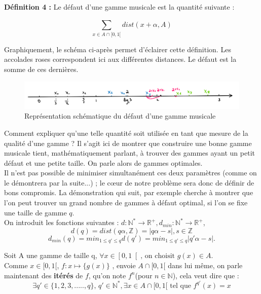\documentclass[moyen]{classeUPD}
\newenvironment{definition}{
	\begin{lrbox}{\tempbox}
		\begin{minipage}{\textwidth}
		}{
		\end{minipage}
	\end{lrbox}
	\begin{center}
		\fcolorbox[HTML]{222222}{EEEEEE}{
			\usebox{\tempbox}
		}
	\end{center}
}
\newcommand{\emf}[1]{\textbf{#1}}
\begin{document}
\begin{definition}
\emf{Définition 4 :} Le défaut d'une gamme musicale est la quantité suivante :

\begin{equation*}
\sum_{x\in A \cap [0,1[}^{} dist(x+\alpha,A)
\end{equation*}

\end{definition}

Graphiquement, le schéma ci-après permet d'éclairer cette définition. Les accolades roses correspondent ici aux différentes distances. Le défaut est la somme de ces dernières.
 
\begin{figure}[h!]
	\begin{center}
		\includegraphics[width=0.7\textheight]{picture1}
		\caption[Défaut d'une gamme musicale]{Représentation schématique du défaut d'une gamme musicale}
		\label{figure 4}
	\end{center}
\end{figure}

Comment expliquer qu’une telle quantité soit utilisée en tant que mesure de la qualité d’une gamme ? Il s’agit ici de montrer que construire une bonne gamme musicale tient, mathématiquement parlant, à trouver des gammes ayant un petit défaut et une petite taille. On parle alors de gammes optimales.\\
Il n’est pas possible de minimiser simultanément ces deux paramètres (comme on le démontrera par la suite...) ; le cœur de notre problème sera donc de définir de bons compromis. La démonstration qui suit, par exemple cherche à montrer que l’on peut trouver un grand nombre de gammes à défaut optimal, si l’on se fixe une taille de gamme $q$.\\

On introduit les fonctions suivantes : $d: \mathbb{N^{*}} \longrightarrow \mathbb{R^{+}} ,d_{min} :\mathbb{N^{*}} \longrightarrow \mathbb{R^{+}} $,
$$d(q)=dist(q\alpha, \mathbb{Z})= \left|q\alpha  - s\right| ,s \in \mathbb{Z}$$
$$d_{min}(q) = min _{1 \le q' \le q} d(q') = min_{1 \le q' \le q} \left|q'\alpha - s\right| .$$

Soit A une gamme de taille q, 
$ \forall x \in \left[0,1\right[ 
\text{, on choisit } g(x)\in A$. \\
Comme $x \in [0,1[ $,  $f: x \mapsto  \{g(x)\}$  , envoie $A\cap [0,1[$ dans lui même, on parle maintenant des \textbf{itérés} de $f$, qu'on note $f^{n}$(pour $n \in \mathbb{N}$), cela veut dire que :
$$\exists q'\in \{1,2,3,.....,q\} \text{, } q'\in \mathbb{N^{*}},\exists x \in A \cap [0,1[ \text{ tel que } f^{q'}(x) = x$$
\end{document}
